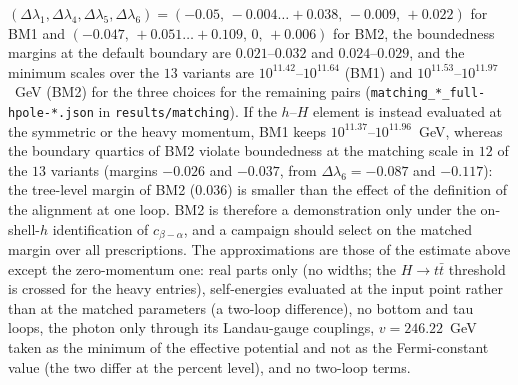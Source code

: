 \documentclass[twocolumn,epjc3]{svjour3}
\begin{document}
$(\Delta\lambda_1,\Delta\lambda_4,\Delta\lambda_5,\Delta\lambda_6)=(-0.05,\,-0.004\ldots+0.038,\,-0.009,\,+0.022)$ for BM1 and $(-0.047,\,+0.051\ldots+0.109,\,0,\,+0.006)$ for BM2, the boundedness margins at the default boundary are $0.021$--$0.032$ and $0.024$--$0.029$, and the minimum scales over the $13$ variants are $10^{11.42}$--$10^{11.64}$ (BM1) and $10^{11.53}$--$10^{11.97}$~GeV (BM2) for the three choices for the remaining pairs (\texttt{matching\_*\_full-hpole-*.json} in \texttt{results/matching}). If the $h$--$H$ element is instead evaluated at the symmetric or the heavy momentum, BM1 keeps $10^{11.37}$--$10^{11.96}$~GeV, whereas the boundary quartics of BM2 violate boundedness at the matching scale in $12$ of the $13$ variants (margins $-0.026$ and $-0.037$, from $\Delta\lambda_6=-0.087$ and $-0.117$): the tree-level margin of BM2 ($0.036$) is smaller than the effect of the definition of the alignment at one loop. BM2 is therefore a demonstration only under the on-shell-$h$ identification of $c_{\beta-\alpha}$, and a campaign should select on the matched margin over all prescriptions. The approximations are those of the estimate above except the zero-momentum one: real parts only (no widths; the $H\to t\bar t$ threshold is crossed for the heavy entries), self-energies evaluated at the input point rather than at the matched parameters (a two-loop difference), no bottom and tau loops, the photon only through its Landau-gauge couplings, $v=246.22$~GeV taken as the minimum of the effective potential and not as the Fermi-constant value (the two differ at the percent level), and no two-loop terms.
\end{document}
